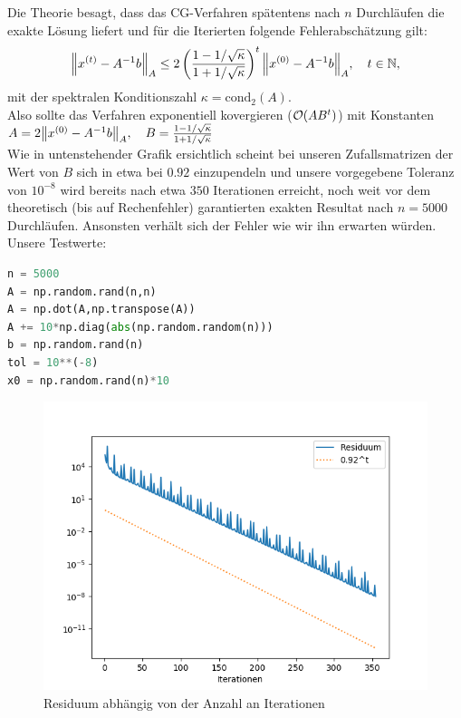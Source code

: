Die Theorie besagt, dass das CG-Verfahren spätentens nach $n$ Durchläufen die exakte Lösung liefert und für die Iterierten
folgende Fehlerabschätzung gilt:
\begin{align*}
  {\left \| x^{(t)}-A^{-1}b \right \|}_A \leq 2\left(\frac{1-1/\sqrt{\kappa}}{1+1/\sqrt{\kappa}}\right)^t{\left \| x^{(0)}-A^{-1}b \right \|}_A, \quad t \in \mathbb{N},
\end{align*}
mit der spektralen Konditionszahl $\kappa = \text{cond}_2(A)$. \\
Also sollte das Verfahren exponentiell kovergieren ($\mathcal{O} {\left ( AB^t \right )}$) mit Konstanten\\
$A = 2{\left \| x^{(0)}-A^{-1}b \right \|}_A, \quad B = \frac{1-1/\sqrt{\kappa}}{1+1/\sqrt{\kappa}}$\\
Wie in untenstehender Grafik ersichtlich scheint bei unseren Zufallsmatrizen der Wert von $B$ sich in etwa bei $0.92$ einzupendeln
und unsere vorgegebene Toleranz von $10^{-8}$ wird bereits nach etwa $350$ Iterationen erreicht, noch weit vor dem theoretisch
(bis auf Rechenfehler) garantierten exakten Resultat nach $n = 5000$ Durchläufen.
Ansonsten verhält sich der Fehler wie wir ihn erwarten würden. \\
Unsere Testwerte: \\

\begin{lstlisting}[language=Python]
n = 5000
A = np.random.rand(n,n)
A = np.dot(A,np.transpose(A))
A += 10*np.diag(abs(np.random.random(n)))
b = np.random.rand(n)
tol = 10**(-8)
x0 = np.random.rand(n)*10
\end{lstlisting}

\begin{figure}
    \centering
    \includegraphics[width=\linewidth]{Aufgabe_1/plot_b.png}
    \caption{Residuum abhängig von der Anzahl an Iterationen}
    \label{fig:my_label}
\end{figure}
\FloatBarrier
